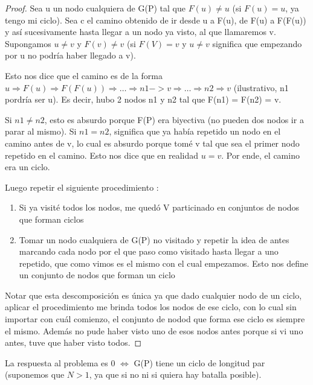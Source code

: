 \begin{proof}
	Sea u un nodo cualquiera de G(P) tal que $F(u) \neq u$ (si $F(u) = u$, ya tengo mi ciclo). Sea c el camino obtenido de ir desde u a F(u), de F(u) a F(F(u)) y así sucesivamente hasta llegar a un nodo ya visto, al que llamaremos v. Supongamos $u \ne v$ y $F(v) \neq v$ (si $F(V) = v$ y $u \ne v$ significa que empezando por u no podría haber llegado a v).  \newline

	Esto nos dice que el camino es de la forma $u \Rightarrow F(u) \Rightarrow F(F(u)) \Rightarrow \ldots \Rightarrow n1 -> v \Rightarrow \ldots \Rightarrow n2 \Rightarrow v$ (ilustrativo, n1 pordría ser u). Es decir, hubo 2 nodos n1 y n2 tal que F(n1) = F(n2) = v.   \newline

	Si $n1 \ne n2$, esto es absurdo porque F(P) era biyectiva (no pueden dos nodos ir a parar al mismo). Si $n1 = n2$, significa que ya había repetido un nodo en el camino antes de v, lo cual es absurdo porque tomé v tal que sea el primer nodo repetido en el camino. Esto nos dice que en realidad $u = v$. Por ende, el camino era un ciclo.  \newline

	Luego repetir el siguiente procedimiento :  \newline

	\begin{enumerate}
		\item{Si ya visité todos los nodos, me quedó V particinado en conjuntos de nodos que forman ciclos}
		\item{Tomar un nodo cualquiera de G(P) no visitado y repetir la idea de antes marcando cada nodo por el que paso como visitado hasta llegar a uno repetido, que como vimos es el mismo con el cual empezamos. Esto nos define un conjunto de nodos que forman un ciclo}
	\end{enumerate}	

	Notar que esta descomposición es única ya que dado cualquier nodo de un ciclo, aplicar el procedimiento me brinda todos los nodos de ese ciclo, con lo cual sin importar con cuál comienzo, el conjunto de nodod que forma ese ciclo es siempre el mismo. Además no pude haber visto uno de esos nodos antes porque si vi uno antes, tuve que haber visto todos.

\end{proof}

\begin{theorem}[La Magia]
	La respuesta al problema es 0 $\iff$ G(P) tiene un ciclo de longitud par (suponemos que $N > 1$, ya que si no ni si quiera hay batalla posible).
\end{theorem}


